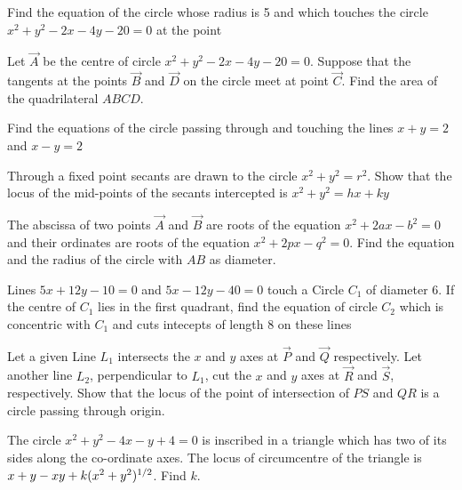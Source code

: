 \iffalse
\title{Assignment 1}
\author{EE24Btech11024 - G.Abhimanyu Koushik}
\section{subjective}
\fi
\item Find the equation of the circle whose radius is 5 and which touches the circle $x^2+y^2-2x-4y-20=0$ at the point 

\hfill {}
\item Let $\vec{A}$ be the centre of circle $x^2+y^2-2x-4y-20=0$. Suppose that the tangents at the points $\vec{B}$ and $\vec{D}$ on the circle meet at point $\vec{C}$. Find the area of the quadrilateral $ABCD$.

\hfill {}
\item Find the equations of the circle passing through  and touching the lines $x+y=2$ and $x-y=2$

\hfill {}
\item Through a fixed point  secants are drawn to the circle $x^2+y^2=r^2$. Show that the locus of the mid-points of the secants intercepted is $x^2+y^2=hx+ky$

\hfill {}
\item The abscissa of two points $\vec{A}$ and $\vec{B}$ are roots of the equation $x^2+2ax-b^2=0$ and their ordinates are roots of the equation $x^2+2px-q^2=0$. Find the equation and the radius of the circle with $AB$ as diameter.

\hfill {}
\item Lines $5x+12y-10=0$ and $5x-12y-40=0$ touch a Circle $C_1$ of diameter 6. If the centre of $C_1$ lies in the first quadrant, find the equation of circle $C_2$ which is concentric with $C_1$ and cuts intecepts of length 8 on these lines

\hfill {}
\item Let a given Line $L_1$ intersects the $x$ and $y$ axes at $\vec{P}$ and $\vec{Q}$ respectively. Let another line $L_2$, perpendicular to $L_1$, cut the $x$ and $y$ axes at $\vec{R}$ and $\vec{S}$, respectively. Show that the locus of the point of intersection of $PS$ and $QR$ is a circle passing through origin.

\hfill {}
\item The circle $x^2+y^2-4x-y+4=0$ is inscribed in a triangle which has two of its sides along the co-ordinate axes. The locus of circumcentre of the triangle is $x+y-xy+k(x^2+y^2)\textsuperscript{1/2}$. Find $k$.

